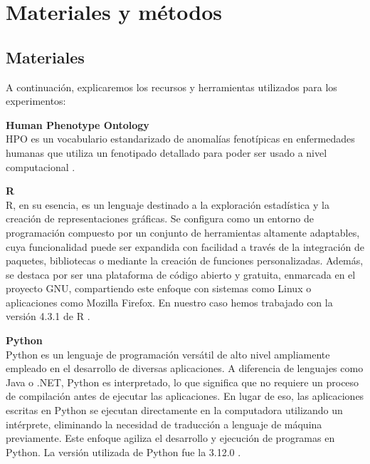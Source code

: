 \section{Materiales y métodos}

\subsection{Materiales}
A continuación, explicaremos los recursos y herramientas utilizados para los experimentos:

\vspace{3pt}

\textbf{Human Phenotype Ontology}\\ HPO es un vocabulario estandarizado de anomalías fenotípicas en enfermedades humanas que utiliza un fenotipado detallado para poder ser usado a nivel computacional \cite{HPO}.

\vspace{3pt}

\textbf{R}\\ R, en su esencia, es un lenguaje destinado a la exploración estadística y la creación de representaciones gráficas. Se configura como un entorno de programación compuesto por un conjunto de herramientas altamente adaptables, cuya funcionalidad puede ser expandida con facilidad a través de la integración de paquetes, bibliotecas o mediante la creación de funciones personalizadas. Además, se destaca por ser una plataforma de código abierto y gratuita, enmarcada en el proyecto GNU, compartiendo este enfoque con sistemas como Linux o aplicaciones como Mozilla Firefox. En nuestro caso hemos trabajado con la versión 4.3.1 de R \cite{Giorgi2022}.

\vspace{3pt}

\textbf{Python}\\
Python es un lenguaje de programación versátil de alto nivel ampliamente empleado en el desarrollo de diversas aplicaciones. A diferencia de lenguajes como Java o .NET, Python es interpretado, lo que significa que no requiere un proceso de compilación antes de ejecutar las aplicaciones. En lugar de eso, las aplicaciones escritas en Python se ejecutan directamente en la computadora utilizando un intérprete, eliminando la necesidad de traducción a lenguaje de máquina previamente. Este enfoque agiliza el desarrollo y ejecución de programas en Python. La versión utilizada de Python fue la 3.12.0 \cite{Mehare2023}.

\vspace{3pt}

